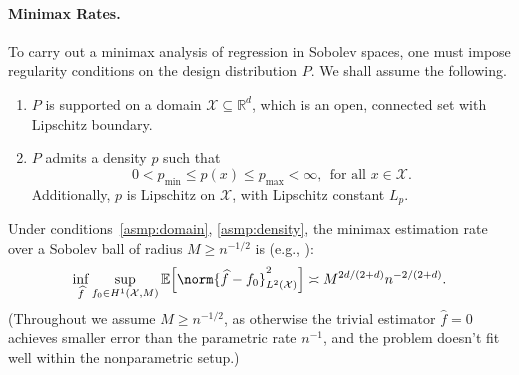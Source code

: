 \documentclass[twoside]{article}
\newcommand{\Reals}{\mathbb{R}}
\newcommand{\1}{\mathbf{1}}
\newcommand{\Rd}{\Reals^d}
\newcommand{\Xset}{\mathcal{X}}
\newcommand{\Ebb}{\mathbb{E}}
\newcommand{\wh}[1]{\widehat{#1}}
\theoremstyle{definition}
\theoremstyle{remark}
\begin{document}
\paragraph{Minimax Rates.}

To carry out a minimax analysis of regression in Sobolev spaces, one must impose regularity conditions on the design distribution $P$. We shall assume the following.
\begin{enumerate}[label=(P\arabic*)]
	\item
	\label{asmp:domain}
	$P$ is supported on a domain $\Xset \subseteq \Rd$, which is an open, connected set with Lipschitz boundary.
	\item
	\label{asmp:density} 
	$P$ admits a density $p$ such that
	\begin{equation*}
	0 < p_{\min} \leq p(x) \leq p_{\max} < \infty, ~~\textrm{for all $x \in \Xset$}.
	\end{equation*}
	Additionally, $p$ is Lipschitz on $\Xset$, with Lipschitz constant $L_p$.
\end{enumerate}

Under conditions~\ref{asmp:domain}, \ref{asmp:density}, the minimax estimation rate over a Sobolev ball of radius $M \geq n^{-1/2}$ is (e.g., \citet{tsybakov2008_book}):
\begin{equation}
\label{eqn:sobolev_space_estimation_minimax_rate}
\inf_{\wh{f}} \sup_{f_0 \in H^1(\Xset, M)} \Ebb\Bigl[\norm{\wh{f} - f_0}_{L^2(\Xset)}^2\Bigr] \asymp M^{2d/(2 + d)} n^{-2/(2 + d)}.
\end{equation}
(Throughout we assume $M \geq n^{-1/2}$, as otherwise the trivial estimator $\wh{f} = 0$ achieves smaller error than the parametric rate $n^{-1}$, and the problem doesn't fit well within the nonparametric setup.) 
\end{document}
